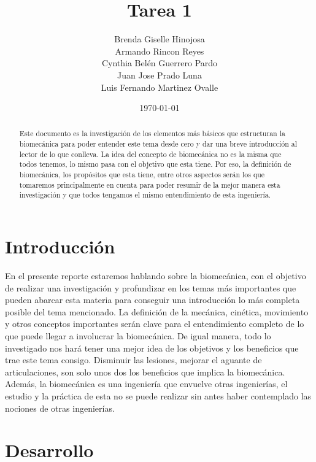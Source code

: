 \documentclass{article}
\author{Brenda Giselle Hinojosa \\ Armando Rincon Reyes \\ Cynthia Belén Guerrero Pardo \\ Juan Jose Prado Luna \\ Luis Fernando Martinez Ovalle} %
\title{Tarea 1} %
\date{\today}
\begin{document}

\maketitle %

\begin{abstract} %
Este documento es la investigación de los elementos más básicos que estructuran la biomecánica para poder entender este tema desde cero y dar una breve introducción al lector de lo que conlleva. La idea del concepto de biomecánica no es la misma que todos tenemos, lo mismo pasa con el objetivo que esta tiene. Por eso, la definición de biomecánica, los propósitos que esta tiene, entre otros aspectos serán los que tomaremos principalmente en cuenta para poder resumir de la mejor manera esta investigación y que todos tengamos el mismo entendimiento de esta ingeniería.
\end{abstract}


\section{Introducci\'{o}n}\label{intro} %
En el presente reporte estaremos hablando sobre la biomecánica, con el objetivo de realizar una investigación y profundizar en los temas más importantes que pueden abarcar esta materia para conseguir una introducción lo más completa posible del tema mencionado. La definición de la mecánica, cinética, movimiento y otros conceptos importantes serán clave para el entendimiento completo de lo que puede llegar a involucrar la biomecánica. 
De igual manera, todo lo investigado nos hará tener una mejor idea de los objetivos y los beneficios que trae este tema consigo. Disminuir las lesiones, mejorar el aguante de articulaciones, son solo unos dos los beneficios que implica la biomecánica. Además, la biomecánica es una ingeniería que envuelve otras ingenierías, el estudio y la práctica de esta no se puede realizar sin antes haber contemplado las nociones de otras ingenierías.  


\section{Desarrollo}
\end{document}
